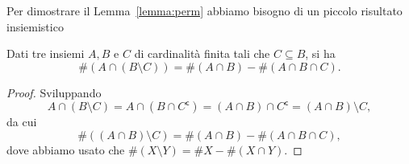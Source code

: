 Per dimostrare il Lemma~\ref{lemma:perm} abbiamo bisogno di un piccolo risultato insiemistico
\begin{lemma}
	\label{lemma:set_diff_card}
	Dati tre insiemi $ A,B $ e $ C $ di cardinalità finita tali che $ C \subseteq B $, si ha
	\begin{equation*}
		\#(A \cap (B \setminus C)) = \#(A \cap B) - \#(A \cap B \cap C).
	\end{equation*}
\end{lemma}
\begin{proof}
	Sviluppando
	\begin{equation*}
		A \cap (B \setminus C) = A \cap (B \cap C^{\mathsf{c}}) = (A \cap B) \cap C^{\mathsf{c}} = (A
		\cap B) \setminus C,
	\end{equation*}
	da cui
	\begin{equation*}
		\#((A \cap B) \setminus C) = \#(A \cap B) - \#(A\cap B\cap C),
	\end{equation*}
	dove abbiamo usato che
	$ \#(X \setminus Y) = \# X - \#(X \cap Y) $.
\end{proof}
